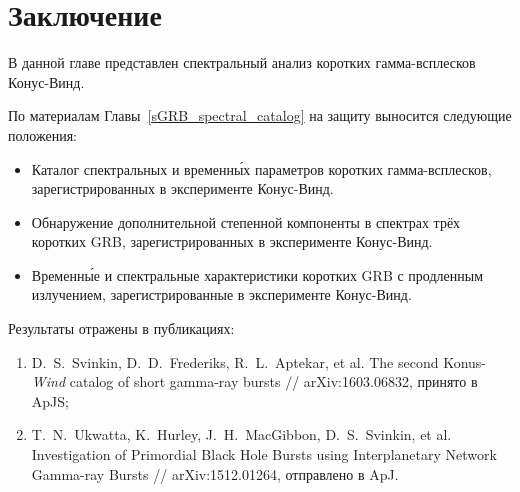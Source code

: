 \section{Заключение}
В данной главе представлен спектральный анализ коротких гамма-всплесков Конус-Винд.

По материалам Главы~\ref{sGRB_spectral_catalog} на защиту выносится следующие положения:
\begin{itemize}
\item Каталог спектральных и временн\'{ы}х параметров коротких гамма-всплесков, 
    зарегистрированных в эксперименте Конус-Винд.
\item Обнаружение дополнительной степенной компоненты в спектрах трёх коротких GRB, 
    зарегистрированных в эксперименте Конус-Винд.
\item Временн\'{ы}е и спектральные характеристики коротких GRB 
    с продленным излучением, зарегистрированные в эксперименте Конус-Винд.
\end{itemize}

Результаты отражены в публикациях:
\begin{enumerate}
\item D.~S.~Svinkin, D.~D.~Frederiks, R.~L.~Aptekar, et al. 
The second Konus-\textit{Wind} catalog of short gamma-ray bursts //
arXiv:1603.06832, принято в ApJS;
\item T.~N.~Ukwatta, K.~Hurley, J.~H.~MacGibbon, D.~S.~Svinkin, et al.
Investigation of Primordial Black Hole Bursts using Interplanetary Network Gamma-ray Bursts // 
arXiv:1512.01264, отправлено в ApJ.
\end{enumerate}


\clearpage